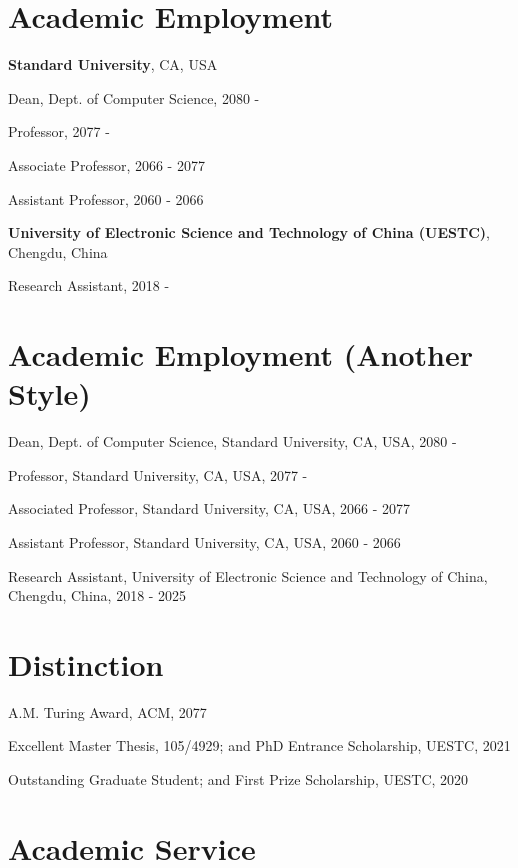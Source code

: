 \documentclass{article}
\begin{document}
\section*{Academic Employment}
\indent

\textbf{Standard University}, CA, USA

\hspace{2em}Dean, Dept. of Computer Science, 2080 - 

\hspace{2em}Professor, 2077 - 

\hspace{2em}Associate Professor, 2066 - 2077

\hspace{2em}Assistant Professor, 2060 - 2066

\textbf{University of Electronic Science and Technology of China (UESTC)}, Chengdu, China

\hspace{2em}Research Assistant, 2018 - 


\section*{Academic Employment (Another Style)}
\indent

Dean, Dept. of Computer Science, Standard University, CA, USA, 2080 -

Professor, Standard University, CA, USA, 2077 -

Associated Professor, Standard University, CA, USA, 2066 - 2077

Assistant Professor, Standard University, CA, USA, 2060 - 2066

Research Assistant, University of Electronic Science and Technology of China, Chengdu, China, 2018 - 2025




\section*{Distinction}
\indent

A.M. Turing Award, ACM, 2077

Excellent Master Thesis, 105/4929; and PhD Entrance Scholarship, UESTC, 2021

Outstanding Graduate Student; and First Prize Scholarship, UESTC, 2020




\section*{Academic Service}
\end{document}
